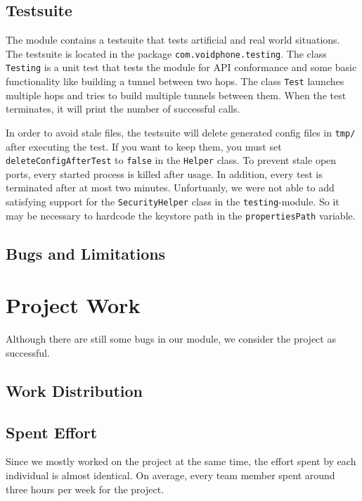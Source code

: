 \documentclass{article}
\begin{document}
\subsection{Testsuite}
The module contains a testsuite that tests artificial and real world situations. The testsuite is
located in the package \texttt{com.voidphone.testing}. The class \texttt{Testing} is a unit test
that tests the module for API conformance and some basic functionality like building a tunnel
between two hops. The class \texttt{Test} launches multiple hops and tries to build multiple
tunnels between them. When the test terminates, it will print the number of successful calls.

In order to avoid stale files, the testsuite will delete generated config files in \texttt{tmp/}
after executing the test. If you want to keep them, you must set \texttt{deleteConfigAfterTest}
to \texttt{false} in the \texttt{Helper} class. To prevent stale open ports, every started process
is killed after usage. In addition, every test is terminated after at most two minutes.
Unfortuanly, we were not able to add satisfying support for the \texttt{SecurityHelper} class in
the \texttt{testing}-module. So it may be necessary to hardcode the keystore path in the
\texttt{propertiesPath} variable.

\subsection{Bugs and Limitations}

\section{Project Work}
Although there are still some bugs in our module, we consider the project as successful.

\subsection{Work Distribution}

\subsection{Spent Effort}
Since we mostly worked on the project at the same time, the effort spent by each individual is
almost identical. On average, every team member spent around three hours per week for the project.
\end{document}
